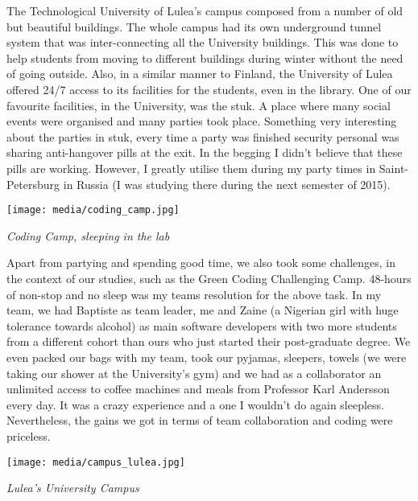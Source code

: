 \documentclass[10pt,a4paper]{article} %
\begin{document}
\begin{multicols}{3}
The Technological University of Lulea's campus composed from a number of old but 
beautiful buildings. 
The whole campus had its own underground tunnel system that was inter-connecting 
all the University buildings. 
This was done to help students from moving to different buildings during winter 
without the need of going outside. 
Also, in a similar manner to Finland, the University of Lulea offered 24/7 access 
to its facilities for the students, even in the library. 
One of our favourite facilities, in the University, was the {\sc stuk}. 
A place where many social events were organised and many parties took place.
Something very interesting about the parties in {\sc stuk}, every time a party 
was finished security personal was sharing anti-hangover pills at the exit. 
In the begging I didn't believe that these pills are working. 
However, I greatly 
utilise them during my party times in Saint-Petersburg in Russia (I was 
studying there during the next semester of 2015).



\begin{center}
	\texttt{[image: media/coding\_camp.jpg]}
	\par\textit{Coding Camp, sleeping in the lab}
\end{center}
  

Apart from partying and spending good time, we also took some challenges, in the 
context of our studies, such as the Green Coding Challenging Camp.
48-hours of non-stop and no sleep was my teams resolution for the above task. 
In my team, we had Baptiste as team leader, me and Zaine (a Nigerian girl with huge 
tolerance towards alcohol) as main software developers with two more students 
from a different cohort than ours who just started their post-graduate degree.  
We even packed our bags with my team, took our pyjamas, sleepers, towels 
(we were taking our shower at the University's gym) and we had as a collaborator an 
unlimited access to coffee machines and meals from Professor Karl Andersson every 
day. 
It was a crazy experience and a one I wouldn't do again sleepless. 
Nevertheless, the gains we got in terms of team collaboration and coding were 
priceless. 


\begin{center}
	\texttt{[image: media/campus\_lulea.jpg]}
	\par\textit{Lulea's University Campus}
\end{center}



\end{multicols}
\end{document}
